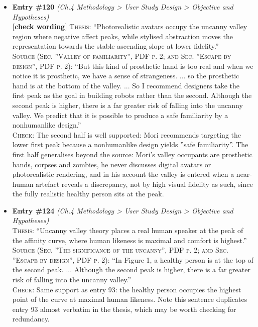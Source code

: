 \documentclass[11pt, a4paper]{article}
\begin{document}
\begin{itemize}[leftmargin=1.2em,itemsep=4pt]
\textsc{Source (Sec. ”The significance of the uncanny”, PDF p. 2; and Sec. ”Escape by design”, PDF p. 2):} ``In Figure 1, a healthy person is at the top of the second peak. ... Although the second peak is higher, there is a far greater risk of falling into the uncanny valley.''\\
\textsc{Check:} Mori places the healthy (real) human at the top of the second peak, and states that this peak is the higher of the two, so maximal human likeness corresponds to maximal familiarity. Mori writes about a healthy person generally, not a speaker, but the thesis's ”real human speaker” is its own stimulus rather than an attributed claim.
\item \textbf{Entry \#120} \textit{(Ch.4 Methodology > User Study Design > Objective and Hypotheses)}\\
\textcolor{partialorange}{\textbf{[check wording]}} \textsc{Thesis:} ``Photorealistic avatars occupy the uncanny valley region where negative affect peaks, while stylised abstraction moves the representation towards the stable ascending slope at lower fidelity.''\\
\textsc{Source (Sec. ”Valley of familiarity”, PDF p. 2; and Sec. ”Escape by design”, PDF p. 2):} ``But this kind of prosthetic hand is too real and when we notice it is prosthetic, we have a sense of strangeness. ... so the prosthetic hand is at the bottom of the valley. ... So I recommend designers take the first peak as the goal in building robots rather than the second. Although the second peak is higher, there is a far greater risk of falling into the uncanny valley. We predict that it is possible to produce a safe familiarity by a nonhumanlike design.''\\
\textsc{Check:} The second half is well supported: Mori recommends targeting the lower first peak because a nonhumanlike design yields ”safe familiarity”. The first half generalises beyond the source: Mori's valley occupants are prosthetic hands, corpses and zombies, he never discusses digital avatars or photorealistic rendering, and in his account the valley is entered when a near-human artefact reveals a discrepancy, not by high visual fidelity as such, since the fully realistic healthy person sits at the peak.
\item \textbf{Entry \#124} \textit{(Ch.4 Methodology > User Study Design > Objective and Hypotheses)}\\
\textsc{Thesis:} ``Uncanny valley theory places a real human speaker at the peak of the affinity curve, where human likeness is maximal and comfort is highest.''\\
\textsc{Source (Sec. ”The significance of the uncanny”, PDF p. 2; and Sec. ”Escape by design”, PDF p. 2):} ``In Figure 1, a healthy person is at the top of the second peak. ... Although the second peak is higher, there is a far greater risk of falling into the uncanny valley.''\\
\textsc{Check:} Same support as entry 93: the healthy person occupies the highest point of the curve at maximal human likeness. Note this sentence duplicates entry 93 almost verbatim in the thesis, which may be worth checking for redundancy.
\end{itemize}
\end{document}
